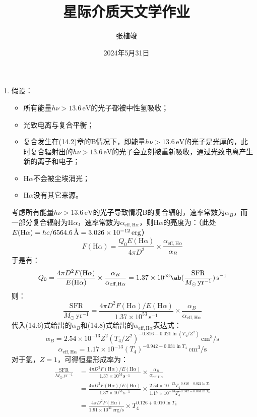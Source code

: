 \documentclass[a4paper,fontset=none]{ctexart}
\title{\textbf{星际介质天文学作业}}
\author{张植竣}
\date{2024年5月31日}
\newcommand{\ang}{\text{\r{A}}}
\begin{document}
\maketitle

\begin{enumerate}
    \item[42.1 (a)]
    假设：
    \begin{itemize}
        \item 所有能量$h\nu > 13.6\,\mathrm{eV}$的光子都被中性氢吸收；
        \item 光致电离与复合平衡；
        \item 复合发生在(14.2)章的B情况下，即能量$h\nu > 13.6\,\mathrm{eV}$的光子是光厚的，此时复合辐射出的$h\nu > 13.6\,\mathrm{eV}$的光子会立刻被重新吸收，通过光致电离产生新的离子和电子；
        \item $\mathrm{H}\alpha$不会被尘埃消光；
        \item $\mathrm{H}\alpha$没有其它来源。
    \end{itemize}
    考虑所有能量$h\nu > 13.6\,\mathrm{eV}$的光子导致情况B的复合辐射，速率常数为$\alpha_B$，而一部分复合辐射为$\mathrm{H}\alpha$，速率常数为$\alpha_{\mathrm{eff},\mathrm{H}\alpha}$，则$\mathrm{H}\alpha$的亮度为：（此处$E(\mathrm{H}\alpha) = hc/6564.6\,\ang = 3.026 \times 10^{-12}\,\mathrm{erg}$）
    \[
        F(\mathrm{H}\alpha) = \frac{Q_0 E(\mathrm{H\alpha})}{4\pi D^2} \times \frac{\alpha_{\mathrm{eff, H}\alpha}}{\alpha_B}
    \]
    于是有：
    \[
        Q_0 = \frac{4\pi D^2 F(\mathrm{H}\alpha)}{E(\mathrm{H}\alpha)} \times \frac{\alpha_B}{\alpha_{\mathrm{eff, H}\alpha}} = 1.37 \times 10^{53} \ab(\frac{\mathrm{SFR}}{M_\odot\,\mathrm{yr^{-1}}})\,\mathrm{s^{-1}}
    \]
    则：
    \[
        \frac{\mathrm{SFR}}{M_\odot\,\mathrm{yr^{-1}}} = \frac{4\pi D^2 F(\mathrm{H}\alpha)/E(\mathrm{H}\alpha)}{1.37 \times 10^{53}\,\mathrm{s^{-1}}} \times \frac{\alpha_B}{\alpha_{\mathrm{eff, H}\alpha}}
    \]
    代入(14.6)式给出的$\alpha_B$和(14.8)式给出的$\alpha_{\mathrm{eff},\mathrm{H}\alpha}$表达式：
    \[
        \alpha_B = 2.54 \times 10^{-13} Z^2 (T_4/Z^2)^{-0.816-0.021\ln(T_4/Z^2)}\,\mathrm{cm^3/s}
    \]
    \[
        \alpha_{\mathrm{eff, H}\alpha} = 1.17 \times 10^{-13} (T_4)^{-0.942-0.031\ln{T_4}}\,\mathrm{cm^3/s}
    \]
    对于氢，$Z=1$，可得恒星形成率为：
    \begin{align*}
        \frac{\mathrm{SFR}}{M_\odot\,\mathrm{yr^{-1}}}
        &= \frac{4\pi D^2 F(\mathrm{H}\alpha)/E(\mathrm{H}\alpha)}{1.37 \times 10^{53}\,\mathrm{s^{-1}}} \times \frac{\alpha_B}{\alpha_{\mathrm{eff, H}\alpha}} \\
        &= \frac{4\pi D^2 F(\mathrm{H}\alpha)/E(\mathrm{H}\alpha)}{1.37 \times 10^{53}\,\mathrm{s^{-1}}} \times \frac{2.54 \times 10^{-13} T_4^{-0.816-0.021\ln{T_4}}}{1.17 \times 10^{-13} T_4^{-0.942-0.031\ln{T_4}}} \\
        &= \frac{4\pi D^2 F(\mathrm{H}\alpha)}{1.91 \times 10^{41}\,\mathrm{erg/s}} \times T_4^{0.126+0.010\ln{T_4}}
    \end{align*}


\end{enumerate}
\end{document}
